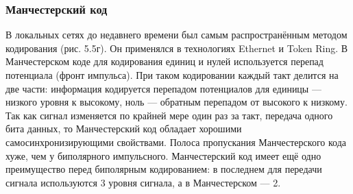 \documentclass[
	a4paper,
	oneside,
	BCOR = 10mm,
	DIV = 12,
	12pt,
	headings = normal,
]{scrartcl}
\begin{document}
				\subsubsection{Манчестерский код}
					В локальных сетях до недавнего времени был самым распространённым методом кодирования (рис. 5.5г). Он применялся в технологиях Ethernet и Token Ring. В Манчестерском коде для кодирования единиц и нулей используется перепад потенциала (фронт импульса). При таком кодировании каждый такт делится на две части: информация кодируется перепадом потенциалов для единицы — низкого уровня к высокому, ноль — обратным перепадом от высокого к низкому. Так как сигнал изменяется по крайней мере один раз за такт, передача одного бита данных, то Манчестерский код обладает хорошими самосинхронизирующими свойствами. Полоса пропускания Манчестерского кода хуже, чем у биполярного импульсного. Манчестерский код имеет ещё одно преимущество перед биполярным кодированием: в последнем для передачи сигнала используются 3 уровня сигнала, а в Манчестерском — 2.
\end{document}
